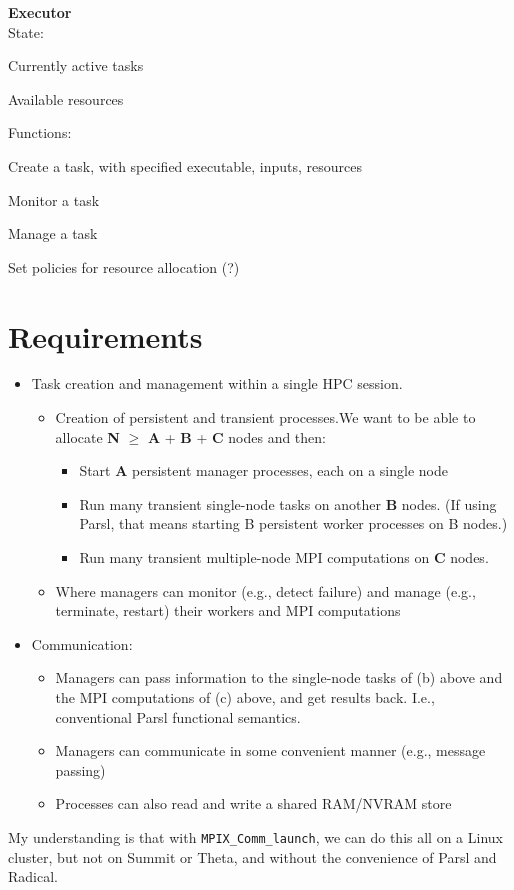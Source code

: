 \documentclass[10pt]{article}
\begin{document}
\vspace{1ex}

\noindent
\textbf{Executor}\\
State:
\begin{compactitem}
\item
Currently active tasks
\item
Available resources
\end{compactitem}
Functions:
\begin{compactitem}
\item
Create a task, with specified executable, inputs, resources
\item
Monitor a task
\item
Manage a task
\item
Set policies for resource allocation (?)
\end{compactitem}





\section{Requirements}

\begin{itemize}
\item
Task creation and management within a single HPC session.
\begin{itemize}
\item Creation of persistent and transient processes.We want to be able to allocate \textbf{N} $\ge$  \textbf{A} +  \textbf{B} +  \textbf{C} nodes and then:
\begin{itemize}
\item
Start  \textbf{A} persistent manager processes, each on a single node
\item
Run many transient single-node tasks on another \textbf{B} nodes. (If using Parsl, that means starting B persistent worker processes on B nodes.)
\item
Run many transient multiple-node MPI computations on  \textbf{C} nodes.
\end{itemize}
\item
Where managers can monitor (e.g., detect failure) and manage (e.g., terminate, restart) their workers and MPI computations
\end{itemize}
\item
Communication:
\begin{itemize}
\item
Managers can pass information to the single-node tasks of (b) above and the MPI computations of (c) above, and get results back. I.e., conventional Parsl functional semantics.
\item
Managers can communicate in some convenient manner (e.g., message passing)
\item
Processes can also read and write a shared RAM/NVRAM store
\end{itemize}
\end{itemize}

My understanding is that with \texttt{MPIX\_Comm\_launch}, we can do this all on a Linux cluster, but not on Summit or Theta, and without the convenience of Parsl and Radical.
\end{document}
